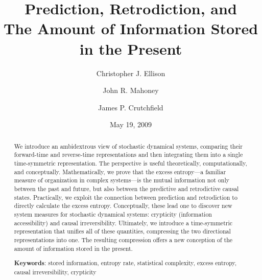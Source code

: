 \def\figscale{.7}



\title{Prediction, Retrodiction, and\\
The Amount of Information Stored in the Present}

\author{Christopher J. Ellison}

\author{John R. Mahoney}

\author{James P. Crutchfield}

\date{May 19, 2009}



\begin{abstract}
We introduce an ambidextrous view of stochastic dynamical systems, comparing
their forward-time and reverse-time representations and then integrating them
into a single time-symmetric representation. The perspective is useful
theoretically, computationally, and conceptually. Mathematically, we prove that
the excess entropy---a familiar measure of organization in complex systems---is
the mutual information not only between the past and future, but also between
the predictive and retrodictive causal states. Practically, we exploit the
connection between prediction and retrodiction to directly calculate the
excess entropy. Conceptually, these lead one to discover new system measures
for stochastic dynamical systems: crypticity (information accessibility) and
causal irreversibility. Ultimately, we introduce a time-symmetric
representation that unifies all of these quantities, compressing the two
directional representations into one. The resulting compression offers a
new conception of the amount of information stored in the present.

\vspace{0.1in}
\noindent
{\bf Keywords}: stored information, entropy rate, statistical
complexity, excess entropy, causal irreversibility, crypticity

\end{abstract}

